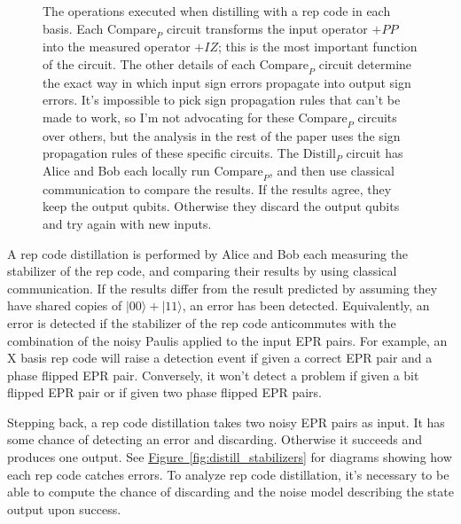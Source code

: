 \documentclass[onecolumn,unpublished,a4paper]{quantumarticle}
\theoremstyle{definition}
\theoremstyle{definition}
\theoremstyle{definition}
\newcommand{\fig}[1]{\hyperref[fig:#1]{Figure~\ref*{fig:#1}}}
\begin{document}
\begin{figure}
    \centering
    \caption{
        The operations executed when distilling with a rep code in each basis.
        Each $\text{Compare}_P$ circuit transforms the input operator $+PP$ into the measured operator $+IZ$; this is the most important function of the circuit.
        The other details of each $\text{Compare}_P$ circuit determine the exact way in which input sign errors propagate into output sign errors.
        It's impossible to pick sign propagation rules that can't be made to work, so I'm not advocating for these $\text{Compare}_P$ circuits over others, but the analysis in the rest of the paper uses the sign propagation rules of these specific circuits.
        The $\text{Distill}_P$ circuit has Alice and Bob each locally run $\text{Compare}_P$, and then use classical communication to compare the results.
        If the results agree, they keep the output qubits.
        Otherwise they discard the output qubits and try again with new inputs.
    }
    \label{fig:distill_blocks}
\end{figure}

A rep code distillation is performed by Alice and Bob each measuring the stabilizer of the rep code, and comparing their results by using classical communication.
If the results differ from the result predicted by assuming they have shared copies of $|00\rangle + |11\rangle$, an error has been detected.
Equivalently, an error is detected if the stabilizer of the rep code anticommutes with the combination of the noisy Paulis applied to the input EPR pairs.
For example, an X basis rep code will raise a detection event if given a correct EPR pair and a phase flipped EPR pair.
Conversely, it won't detect a problem if given a bit flipped EPR pair or if given two phase flipped EPR pairs.

Stepping back, a rep code distillation takes two noisy EPR pairs as input.
It has some chance of detecting an error and discarding.
Otherwise it succeeds and produces one output.
See \fig{distill_stabilizers} for diagrams showing how each rep code catches errors.
To analyze rep code distillation, it's necessary to be able to compute the chance of discarding and the noise model describing the state output upon success.
\end{document}

